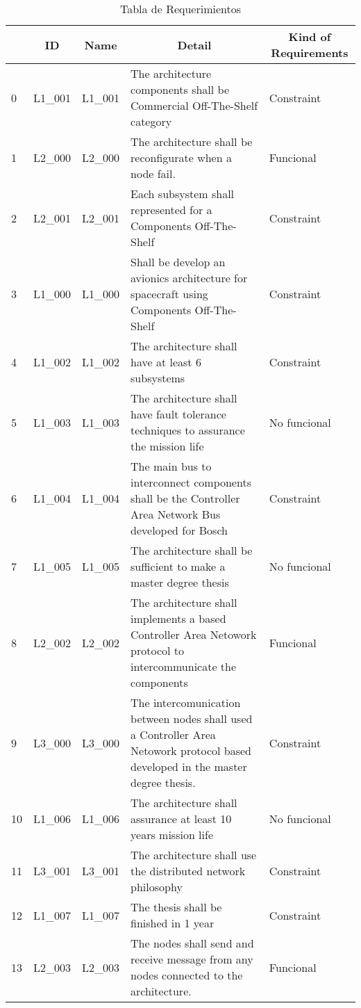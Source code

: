 \begin{table}[]
\small
\centering
\caption{Tabla de Requerimientos}
\label{table:Requerimientos}
\begin{tabular}{|l|l|l|p{7cm}|p{2cm}|}
\hline
\multicolumn{1}{|c|}{\textbf{}} & \multicolumn{1}{c|}{\textbf{ID}} & \multicolumn{1}{c|}{\textbf{Name}} & \multicolumn{1}{c|}{\textbf{Detail}} & \multicolumn{1}{c|}{\textbf{Kind of Requirements}} \\ \hline
0 & L1\_001 & L1\_001 & The architecture components shall be Commercial Off-The-Shelf category & Constraint \\ \hline
1 & L2\_000 & L2\_000 & The architecture shall be reconfigurate when a node fail. & Funcional \\ \hline
2 & L2\_001 & L2\_001 & Each subsystem shall represented for a Components Off-The-Shelf & Constraint \\ \hline
3 & L1\_000 & L1\_000 & Shall be develop an avionics architecture for spacecraft using Components Off-The-Shelf & Constraint \\ \hline
4 & L1\_002 & L1\_002 & The architecture shall have at least 6 subsystems & Constraint \\ \hline
5 & L1\_003 & L1\_003 & The architecture shall have fault tolerance techniques to assurance the mission life & No funcional \\ \hline
6 & L1\_004 & L1\_004 & The main bus to interconnect components shall be the Controller Area Network Bus developed for Bosch & Constraint \\ \hline
7 & L1\_005 & L1\_005 & The architecture shall be sufficient to make a master degree thesis & No funcional \\ \hline
8 & L2\_002 & L2\_002 & The architecture shall implements a based Controller Area Netowork protocol to intercommunicate the components & Funcional \\ \hline
9 & L3\_000 & L3\_000 & The intercomunication between nodes shall used a Controller Area Netowork protocol based developed in the master degree thesis. & Constraint\\ \hline
10 & L1\_006 & L1\_006 & The architecture shall assurance at least 10 years mission life & No funcional \\ \hline
11 & L3\_001 & L3\_001 & The architecture shall use the distributed network philosophy & Constraint \\ \hline
12 & L1\_007 & L1\_007 & The thesis shall be finished in 1 year & Constraint \\ \hline
13 & L2\_003 & L2\_003 & The nodes shall send and receive message from any nodes connected to the architecture. & Funcional \\ \hline
\end{tabular}%
\end{table}

